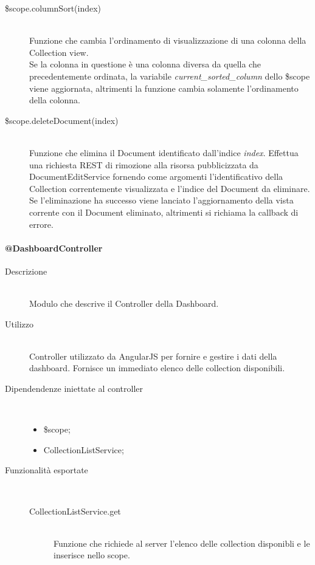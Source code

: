 \begin{description}
\begin{description}
  \item[\$scope.columnSort(index)] \hfill \\
  Funzione che cambia l'ordinamento di visualizzazione di una colonna della Collection view. \\
  Se la colonna in questione è una colonna diversa da quella che precedentemente ordinata,
  la variabile \emph{current\_sorted\_column} dello \$scope viene aggiornata, altrimenti la funzione cambia solamente
  l'ordinamento della colonna.
  
  \item[\$scope.deleteDocument(index)] \hfill \\
  Funzione che elimina il Document identificato dall'indice \emph{index}. Effettua una richiesta REST di rimozione alla risorsa
  pubblicizzata da DocumentEditService fornendo come argomenti l'identificativo della Collection correntemente visualizzata e l'indice
  del Document da eliminare. \\
  Se l'eliminazione ha successo viene lanciato l'aggiornamento della vista corrente con il Document eliminato, altrimenti si
  richiama la callback di errore.
  
 \end{description}
\end{description}

\paragraph{@DashboardController}
\begin{description}
 \item[Descrizione] \hfill \\
 Modulo che descrive il Controller della Dashboard.
 
 \item[Utilizzo] \hfill \\
 Controller utilizzato da AngularJS per fornire e gestire i dati della dashboard.
Fornisce un immediato elenco delle collection disponibili.
 
 \item[Dipendendenze iniettate al controller] \hfill \\
 \begin{itemize}
  \item \$scope;
  \item CollectionListService;
  
 \end{itemize}
 
 \item[Funzionalità esportate] \hfill \\
 \begin{description}
  \item[CollectionListService.get] \hfill \\
  Funzione che richiede al server l'elenco delle collection disponibli e le inserisce nello scope.
  
 \end{description}
\end{description}

